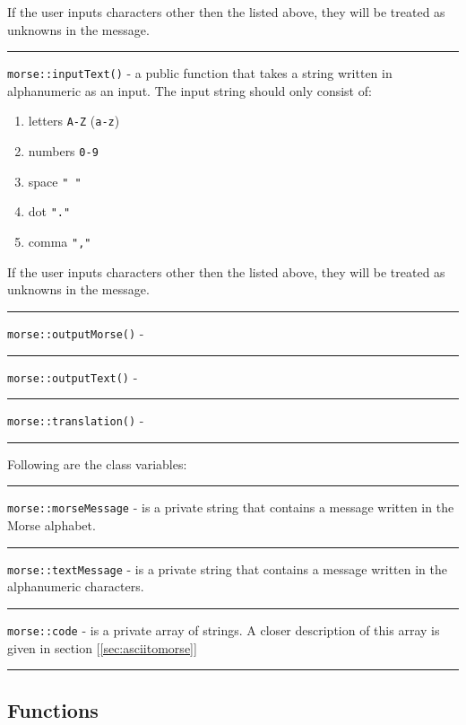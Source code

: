 \documentclass[12pt]{report}
\begin{document}
If the user inputs characters other then the listed above, they will be treated as unknowns in the message.

\rule{\textwidth}{0.5pt}


\verb|morse::inputText()| - a public function that takes a string written in alphanumeric as an input. The input string should only consist of:

\begin{enumerate}
\item letters \verb|A-Z| (\verb|a-z|)
\item numbers \verb|0-9|
\item space \verb|" "|
\item dot \verb|"."|
\item comma \verb|","|
\end{enumerate}

If the user inputs characters other then the listed above, they will be treated as unknowns in the message.

\rule{\textwidth}{0.5pt}

\verb|morse::outputMorse()| - 

\rule{\textwidth}{0.5pt}

\verb|morse::outputText()| - 

\rule{\textwidth}{0.5pt}

\verb|morse::translation()| - 

\rule{\textwidth}{0.5pt}



Following are the class variables:

\rule{\textwidth}{0.5pt}

\verb|morse::morseMessage| - is a private string that contains a message written in the Morse alphabet.

\rule{\textwidth}{0.5pt}

\verb|morse::textMessage| - is a private string that contains a message written in the alphanumeric characters.

\rule{\textwidth}{0.5pt}

\verb|morse::code| - is a private array of strings. A closer description of this array is given in section [\ref{sec:asciitomorse}]

\rule{\textwidth}{0.5pt}

\subsection{Functions}
\end{document}
